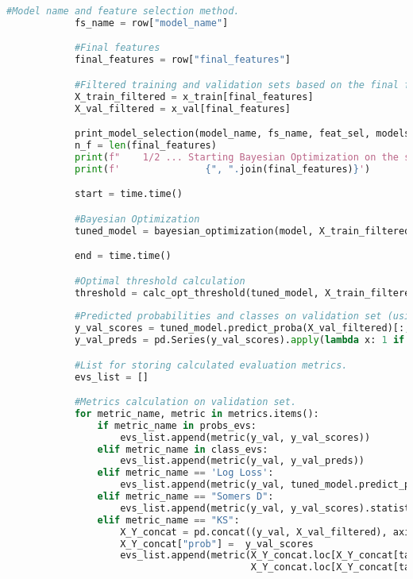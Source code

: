 \begin{lstlisting}[language=Python, basicstyle=\footnotesize\ttfamily]
            #Model name and feature selection method.
            fs_name = row["model_name"]

            #Final features
            final_features = row["final_features"]

            #Filtered training and validation sets based on the final features.
            X_train_filtered = x_train[final_features]
            X_val_filtered = x_val[final_features]

            print_model_selection(model_name, fs_name, feat_sel, models_dict, dashes, count)
            n_f = len(final_features)
            print(f"    1/2 ... Starting Bayesian Optimization on the subset of features ({n_f} features):")
            print(f'               {", ".join(final_features)}')

            start = time.time()

            #Bayesian Optimization
            tuned_model = bayesian_optimization(model, X_train_filtered, y_train, seed, objective_function)

            end = time.time()

            #Optimal threshold calculation
            threshold = calc_opt_threshold(tuned_model, X_train_filtered, y_train)
            
            #Predicted probabilities and classes on validation set (using optimal threshold)
            y_val_scores = tuned_model.predict_proba(X_val_filtered)[:, 1]
            y_val_preds = pd.Series(y_val_scores).apply(lambda x: 1 if x > threshold else 0)

            #List for storing calculated evaluation metrics.
            evs_list = []

            #Metrics calculation on validation set.
            for metric_name, metric in metrics.items():
                if metric_name in probs_evs:
                    evs_list.append(metric(y_val, y_val_scores))
                elif metric_name in class_evs:
                    evs_list.append(metric(y_val, y_val_preds))
                elif metric_name == 'Log Loss':
                    evs_list.append(metric(y_val, tuned_model.predict_proba(X_val_filtered)))
                elif metric_name == "Somers D":
                    evs_list.append(metric(y_val, y_val_scores).statistic)
                elif metric_name == "KS":
                    X_Y_concat = pd.concat((y_val, X_val_filtered), axis = 1)
                    X_Y_concat["prob"] =  y_val_scores
                    evs_list.append(metric(X_Y_concat.loc[X_Y_concat[target] == 1, "prob"],
                                           X_Y_concat.loc[X_Y_concat[target] == 0, "prob"]).statistic)


\end{lstlisting}
